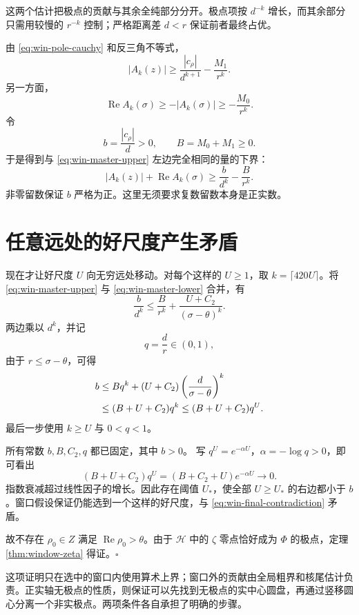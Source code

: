 这两个估计把极点的贡献与其余全纯部分分开。极点项按 $d^{-k}$ 增长，而其余部分只需用较慢的 $r^{-k}$ 控制；严格距离差 $d<r$ 保证前者最终占优。

由 \eqref{eq:win-pole-cauchy} 和反三角不等式，
\[
 |A_k(z)|\ge\frac{|c_\rho|}{d^{k+1}}-\frac{M_1}{r^k}.
\]
另一方面，
\[
 \operatorname{Re}A_k(\sigma)
       \ge-|A_k(\sigma)|\ge-\frac{M_0}{r^k}.
\]
令
\begin{equation}
 b=\frac{|c_\rho|}{d}>0,\qquad B=M_0+M_1\ge0.
 \label{eq:win-lower-constants}
\end{equation}
于是得到与 \eqref{eq:win-master-upper} 左边完全相同的量的下界：
\begin{equation}
 |A_k(z)|+\operatorname{Re}A_k(\sigma)
       \ge\frac b{d^k}-\frac B{r^k}.
 \label{eq:win-master-lower}
\end{equation}
非零留数保证 $b$ 严格为正。这里无须要求复数留数本身是正实数。

\section{任意远处的好尺度产生矛盾}

现在才让好尺度 $U$ 向无穷远处移动。对每个这样的 $U\ge1$，取
$k=\lceil420U\rceil$。将
\eqref{eq:win-master-upper} 与
\eqref{eq:win-master-lower} 合并，有
\[
 \frac b{d^k}
 \le\frac B{r^k}+\frac{U+C_2}{(\sigma-\theta)^k}.
\]
两边乘以 $d^k$，并记
\[
 q=\frac dr\in(0,1),
\]
由于 $r\le\sigma-\theta$，可得
\begin{align}
 b
 &\le Bq^k+(U+C_2)
          \left(\frac d{\sigma-\theta}\right)^k\notag\\
 &\le(B+U+C_2)q^k
 \le(B+U+C_2)q^U.
 \label{eq:win-final-contradiction}
\end{align}
最后一步使用 $k\ge U$ 与 $0<q<1$。

所有常数 $b,B,C_2,q$ 都已固定，其中 $b>0$。
写 $q^U=e^{-\alpha U}$，$\alpha=-\log q>0$，即可看出
\[
 (B+U+C_2)q^U
       =(B+C_2+U)e^{-\alpha U}\longrightarrow0.
\]
指数衰减超过线性因子的增长。因此存在阈值 $U_*$，使全部 $U\ge U_*$ 的右边都小于 $b$。窗口假设保证仍能选到一个这样的好尺度，与
\eqref{eq:win-final-contradiction} 矛盾。

故不存在 $\rho_0\in Z$ 满足
$\operatorname{Re}\rho_0>\theta$。由于 $\mathcal H$ 中的 $\zeta$ 零点恰好成为 $\Phi$ 的极点，定理
\ref{thm:window-zeta} 得证。\hfill$\square$

这项证明只在选中的窗口内使用算术上界；窗口外的贡献由全局粗界和核尾估计负责。正实轴无极点的性质，则保证可以先找到无极点的实中心圆盘，再通过竖移圆心分离一个非实极点。两项条件各自承担了明确的步骤。

